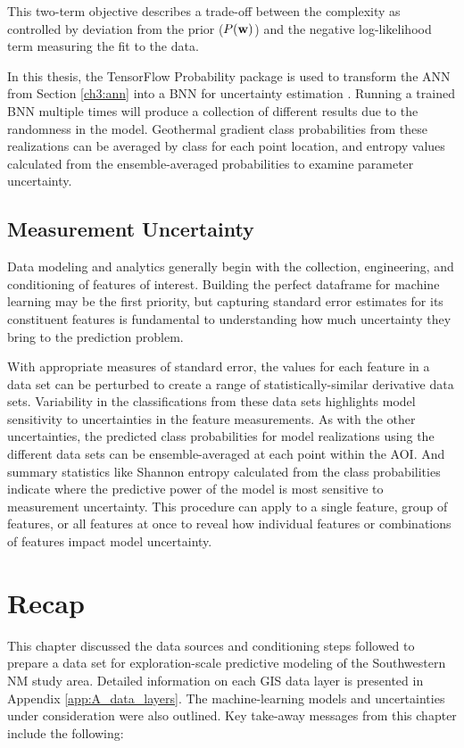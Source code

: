 This two-term objective describes a trade-off between the complexity as controlled by deviation from the prior ($P({\bf w})$) and the negative log-likelihood term measuring the fit to the data.

In this thesis, the TensorFlow Probability package is used to transform the ANN from Section \ref{ch3:ann} into a BNN for uncertainty estimation \citep{dillon_tensorflow_2017}. Running a trained BNN multiple times will produce a collection of different results due to the randomness in the model. Geothermal gradient class probabilities from these realizations can be averaged by class for each point location, and entropy values calculated from the ensemble-averaged probabilities to examine parameter uncertainty.

\subsection{Measurement Uncertainty}\label{ch3:measure_uncertainty}
Data modeling and analytics generally begin with the collection, engineering, and conditioning of features of interest. Building the perfect dataframe for machine learning may be the first priority, but capturing standard error estimates for its constituent features is fundamental to understanding how much uncertainty they bring to the prediction problem.

With appropriate measures of standard error, the values for each feature in a data set can be perturbed to create a range of statistically-similar derivative data sets. Variability in the classifications from these data sets highlights model sensitivity to uncertainties in the feature measurements. As with the other uncertainties, the predicted class probabilities for model realizations using the different data sets can be ensemble-averaged at each point within the AOI. And summary statistics like Shannon entropy calculated from the class probabilities indicate where the predictive power of the model is most sensitive to measurement uncertainty. This procedure can apply to a single feature, group of features, or all features at once to reveal how individual features or combinations of features impact model uncertainty.

\section{Recap}\label{ch3:recap}
This chapter discussed the data sources and conditioning steps followed to prepare a data set for exploration-scale predictive modeling of the Southwestern NM study area. Detailed information on each GIS data layer is presented in Appendix \ref{app:A_data_layers}. The machine-learning models and uncertainties under consideration were also outlined. Key take-away messages from this chapter include the following:

